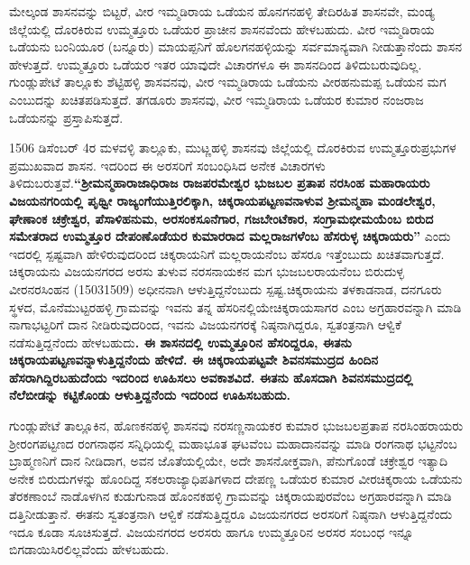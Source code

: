 ಮೇಲ್ಕಂಡ ಶಾಸನವನ್ನು ಬಿಟ್ಟರೆ, ವೀರ ಇಮ್ಮಡಿರಾಯ ಒಡೆಯನ ಹೊನಗನಹಳ್ಳಿ ತೇದಿರಹಿತ ಶಾಸನವೇ, ಮಂಡ್ಯ ಜಿಲ್ಲೆಯಲ್ಲಿ ದೊರಕಿರುವ ಉಮ್ಮತ್ತೂರು ಒಡೆಯರ ಪ್ರಾಚೀನ ಶಾಸನವೆಂದು ಹೇಳಬಹುದು. ವೀರ ಇಮ್ಮಡಿರಾಯ ಒಡೆಯನು ಬಂನಿಯೂರ (ಬನ್ನೂರು) ಮಾಯಪ್ಪನಿಗೆ ಹೊಲಗನಹಳ್ಳಿಯನ್ನು ಸರ್ವಮಾನ್ಯವಾಗಿ ನೀಡುತ್ತಾನೆಂದು ಶಾಸನ ಹೇಳುತ್ತದೆ. ಉಮ್ಮತ್ತೂರು ಒಡೆಯರ ಇತರ ಯಾವುದೇ ವಿಚಾರಗಳೂ ಈ ಶಾಸನದಿಂದ ತಿಳಿದುಬರುವುದಿಲ್ಲ. ಗುಂಡ್ಲುಪೇಟೆ ತಾಲ್ಲೂಕು ಶೆಟ್ಟಿಹಳ್ಳಿ ಶಾಸವನವು, ವೀರ ಇಮ್ಮಡಿರಾಯ ಒಡೆಯನು ವೀರಹನುಮಪ್ಪ ಒಡೆಯನ ಮಗ ಎಂಬುದನ್ನು ಖಚಿತಪಡಿಸುತ್ತದೆ. ತಗಡೂರು ಶಾಸನವು, ವೀರ ಇಮ್ಮಡಿರಾಯ ಒಡೆಯರ ಕುಮಾರ ನಂಜರಾಜ ಒಡೆಯನನ್ನು ಪ್ರಸ್ತಾಪಿಸುತ್ತದೆ.

1506 ಡಿಸೆಂಬರ್​ 4ರ ಮಳವಳ್ಳಿ ತಾಲ್ಲೂಕು, ಮುಟ್ಣಹಳ್ಳಿ ಶಾಸನವು ಜಿಲ್ಲೆಯಲ್ಲಿ ದೊರಕಿರುವ ಉಮ್ಮತ್ತೂರು\break ಪ್ರಭುಗಳ ಪ್ರಮುಖವಾದ ಶಾಸನ. ಇದರಿಂದ ಈ ಅರಸರಿಗೆ ಸಂಬಂಧಿಸಿದ ಅನೇಕ ವಿಚಾರಗಳು ತಿಳಿದುಬರುತ್ತವೆ.\break \textbf{“ಶ‍್ರೀಮನ್ಮಹಾರಾಜಾಧಿರಾಜ ರಾಜಪರಮೇಶ್ವರ ಭುಜಬಲ ಪ್ರತಾಪ ನರಸಿಂಹ ಮಹಾರಾಯರು ವಿಜಯನಗರಿಯಲ್ಲಿ ಪೃಥ್ವೀ ರಾಜ್ಯಂಗೆಯುತ್ತಿರಲಿಕ್ಕಾಗಿ, ಚಿಕ್ಕರಾಯಪಟ್ಟಣವನಾಳುವ ಶ‍್ರೀಮನ್ಮಹಾ ಮಂಡಲೇಶ್ವರ, ಘೇಣಾಂಕ ಚಕ್ರೇಶ್ವರ, ಪೆಸಾಳಿಹನುಮ, ಅರಸಂಕಸೂನೆಗಾರ, ಗಜಬೇಂಟೆಕಾರ, ಸಂಗ್ರಾಮಭೀಮಯೆಂಬ ಬಿರುದ ಸಮೇತರಾದ ಉಮ್ಮತ್ತೂರ ದೇಪಂಣೊಡೆಯರ ಕುಮಾರರಾದ ಮಲ್ಲರಾಜಗಳೆಂಬ ಹೆಸರುಳ್ಳ ಚಿಕ್ಕರಾಯರು” }ಎಂದು ಇದರಲ್ಲಿ ಸ್ಪಷ್ಟವಾಗಿ ಹೇಳಿರುವುದರಿಂದ ಚಿಕ್ಕರಾಯನಿಗೆ ಮಲ್ಲರಾಯನೆಂಬ ಹೆಸರೂ ಇತ್ತೆಂಬುದು ಖಚಿತವಾಗುತ್ತದೆ. ಚಿಕ್ಕರಾಯನು ವಿಜಯನಗರದ ಅರಸು ತುಳುವ ನರಸನಾಯಕನ ಮಗ ಭುಜಬಲರಾಯನೆಂಬ ಬಿರುದುಳ್ಳ ವೀರನರಸಿಂಹನ (15031509) ಅಧೀನನಾಗಿ ಆಳುತ್ತಿದ್ದನೆಂಬುದು ಸ್ಪಷ್ಟ.\break ಚಿಕ್ಕರಾಯನು ತಳಕಾಡನಾಡ, ದನಗೂರು ಸ್ಥಳದ, ಮೊನೆಮುಟ್ಟರಹಳ್ಳಿ ಗ್ರಾಮವನ್ನು ಇವನು ತನ್ನ ಹೆಸರಿನಲ್ಲಿಯೇ\break ಚಿಕ್ಕರಾಯಸಾಗರ ಎಂಬ ಅಗ್ರಹಾರವನ್ನಾಗಿ ಮಾಡಿ ನಾಗಾಭಟ್ಟರಿಗೆ ದಾನ ನೀಡಿರುವುದರಿಂದ, ಇವನು ವಿಜಯನಗರಕ್ಕೆ ನಿಷ್ಠನಾಗಿದ್ದರೂ, ಸ್ವತಂತ್ರನಾಗಿ ಆಳ್ವಿಕೆ ನಡೆಸುತ್ತಿದ್ದನೆಂದು ಹೇಳಬಹುದು\textbf{. ಈ ಶಾಸನದಲ್ಲಿ ಉಮ್ಮತ್ತೂರಿನ ಹೆಸರಿದ್ದರೂ, ಈತನು ಚಿಕ್ಕರಾಯಪಟ್ಟಣವನ್ನಾಳುತ್ತಿದ್ದನೆಂದು ಹೇಳಿದೆ. ಈ ಚಿಕ್ಕರಾಯಪಟ್ಟವೇ ಶಿವನಸಮುದ್ರದ ಹಿಂದಿನ ಹೆಸರಾಗಿದ್ದಿರಬಹುದೆಂದು ಇದರಿಂದ ಊಹಿಸಲು ಅವಕಾಶವಿದೆ. ಈತನು ಹೊಸದಾಗಿ ಶಿವನಸಮುದ್ರದಲ್ಲಿ ನೆಲೆಬೀಡನ್ನು ಕಟ್ಟಿಕೊಂಡು ಆಳುತ್ತಿದ್ದನೆಂದು ಇದರಿಂದ ಊಹಿಸಬಹುದು. }

ಗುಂಡ್ಲುಪೇಟೆ ತಾಲ್ಲೂಕಿನ, ಹೊಣಕನಹಳ್ಳಿ ಶಾಸನವು ನರಸಣ್ಣನಾಯಕರ ಕುಮಾರ ಭುಜಬಲಪ್ರತಾಪ ನರಸಿಂಹರಾಯರು ಶ‍್ರೀರಂಗಪಟ್ಟಣದ ರಂಗನಾಥನ ಸನ್ನಿಧಿಯಲ್ಲಿ ಮಹಾಭೂತ ಘಟವೆಂಬ ಮಹಾದಾನವನ್ನು ಮಾಡಿ ರಂಗನಾಥ ಭಟ್ಟನೆಂಬ ಬ್ರಾಹ್ಮಣನಿಗೆ ದಾನ ನೀಡಿದಾಗ, ಅವನ ಜೊತೆಯಲ್ಲಿಯೇ, ಅದೇ ಶಾಸನೋಕ್ತವಾಗಿ, ಪೆನುಗೊಂಡೆ ಚಕ್ರೇಶ್ವರ ಇತ್ಯಾದಿ ಅನೇಕ ಬಿರುದುಗಳನ್ನು ಹೊಂದಿದ್ದ ಸಕಲರಾಜ್ಯಾಧಿಪತಿಗಳಾದ ದೇಪಣ್ಣ ಒಡೆಯರ ಕುಮಾರ ವೀರಚಿಕ್ಕರಾಯ ಒಡೆಯನು ತೆರಕಣಾಂಬೆ ನಾಡೊಳಗಿನ ಕುಡುಗುನಾಡ ಹೊಂನಕಹಳ್ಳಿ ಗ್ರಾಮವನ್ನು ಚಿಕ್ಕರಾಯಪುರವೆಂಬ ಅಗ್ರಹಾರವನ್ನಾಗಿ ಮಾಡಿ ದತ್ತಿನೀಡುತ್ತಾನೆ. ಈತನು ಸ್ವತಂತ್ರನಾಗಿ ಆಳ್ವಿಕೆ ನಡೆಸುತ್ತಿದ್ದರೂ ವಿಜಯನಗರದ ಅರಸರಿಗೆ ನಿಷ್ಠನಾಗಿ ಆಳುತ್ತಿದ್ದನೆಂದು ಇದೂ ಕೂಡಾ ಸೂಚಿಸುತ್ತದೆ. ವಿಜಯನಗರದ ಅರಸರು ಹಾಗೂ ಉಮ್ಮತ್ತೂರಿನ ಅರಸರ ಸಂಬಂಧ ಇನ್ನೂ ಬಿಗಡಾಯಿಸಿರಲಿಲ್ಲವೆಂದು ಹೇಳಬಹುದು. 


